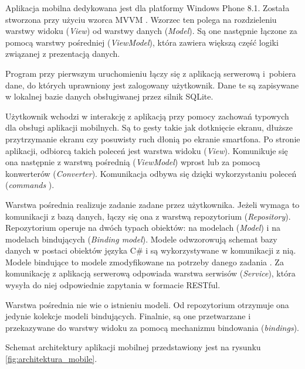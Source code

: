 \documentclass{book}
\begin{document}
			Aplikacja mobilna dedykowana jest dla platformy Windows Phone 8.1. Została stworzona przy użyciu wzorca MVVM . Wzorzec ten polega na rozdzieleniu warstwy widoku (\emph{View}) od warstwy danych (\emph{Model}). Są one następnie łączone  za pomocą warstwy pośredniej (\emph{ViewModel}), która zawiera większą część logiki związanej z prezentacją danych. 
			
			Program przy pierwszym uruchomieniu łączy się z aplikacją serwerową i~pobiera dane, do których uprawniony jest zalogowany użytkownik. Dane te są zapisywane w lokalnej bazie danych obsługiwanej przez silnik SQLite. 
			
			Użytkownik wchodzi w interakcję z aplikacją przy pomocy zachowań typowych dla obsługi aplikacji mobilnych. Są to gesty takie jak dotknięcie ekranu, dłuższe przytrzymanie ekranu czy posuwisty ruch dłonią po ekranie smartfona. 
			Po stronie aplikacji, odbiorcą takich poleceń jest warstwa widoku (\emph{View}). Komunikuje się ona następnie z warstwą pośrednią (\emph{ViewModel}) wprost lub za pomocą konwerterów (\emph{Converter}). Komunikacja odbywa się dzięki wykorzystaniu poleceń (\emph{commands} ). 
			
			Warstwa pośrednia realizuje zadanie zadane przez użytkownika. Jeżeli wymaga to komunikacji z bazą danych, łączy się ona z warstwą repozytorium (\emph{Repository}). Repozytorium operuje na dwóch typach obiektów: na modelach (\emph{Model}) i na modelach bindujących  (\emph{Binding model}). Modele odwzorowują schemat bazy danych w postaci obiektów języka C\# i są wykorzystywane w komunikacji z nią. Modele bindujące  to modele zmodyfikowane na potrzeby danego zadania . Za komunikację z aplikacją serwerową odpowiada warstwa serwisów (\emph{Service}), która wysyła do niej odpowiednie zapytania w formacie RESTful. 
			
			Warstwa pośrednia nie wie o istnieniu modeli. Od repozytorium otrzymuje ona jedynie kolekcje modeli bindujących. Finalnie, są one przetwarzane i przekazywane do warstwy widoku za pomocą mechanizmu bindowania  (\emph{bindings}).
			
			Schemat architektury aplikacji mobilnej przedstawiony jest na rysunku \ref{fig:architektura_mobile}. 
			
\end{document}
